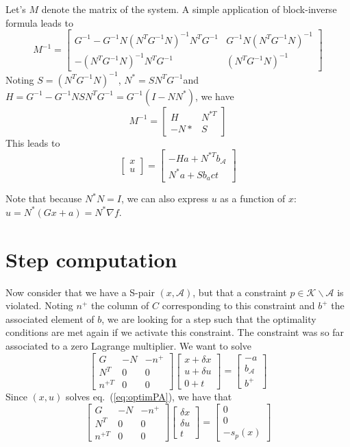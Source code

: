 \documentclass[11pt,a4paper]{article}
\newcommand{\BIN}{\begin{bmatrix}}
\newcommand{\BOUT}{\end{bmatrix}}
\newcommand{\eq}[1]{eq.~(\ref{eq:#1})}
\newcommand{\act}{\mathcal{A}}
\begin{document}
Let's $M$ denote the matrix of the system. A simple application of block-inverse formula leads to
\begin{equation}
M^{-1} = \BIN G^{-1} - G^{-1} N (N^T G^{-1} N)^{-1} N^T G^{-1} & G^{-1} N (N^T G^{-1} N)^{-1} \\ - (N^T G^{-1} N)^{-1} N^T G^{-1} & (N^T G^{-1} N)^{-1} \BOUT
\end{equation}
Noting $S = (N^T G^{-1} N)^{-1}$, $N^* = S N^T G^{-1}$\newline and $H = G^{-1} - G^{-1} N S N^T G^{-1} = G^{-1}(I-N N^*)$, we have
\begin{equation}
M^{-1} = \BIN H & N^{*T} \\ - N* & S \BOUT
\end{equation}
This leads to 
\begin{equation}
	\BIN x \\ u \BOUT = \BIN -H a + N^{*T} b_\act \\ N^* a + S b_act\BOUT
\end{equation}

Note that because $N^* N = I$, we can also express $u$ as a function of $x$: $u = N^* (Gx+a) = N^* \nabla f$.


\section{Step computation}
Now consider that we have a S-pair $(x,\act)$, but that a constraint $p \in \mathcal{K} \backslash \act$ is violated. Noting $n^+$ the column of $C$ corresponding to this constraint and $b^+$ the associated element of $b$, we are looking for a step such that the optimality conditions are met again if we activate this constraint. The constraint was so far associated to a zero Lagrange multiplier. We want to solve
\begin{equation}
	\BIN G & -N & -n^+ \\ N^T & 0 & 0 \\ n^{+T} & 0 & 0\BOUT \BIN x + \delta x \\ u + \delta u \\ 0 + t\BOUT = \BIN -a \\ b_\act \\ b^+\BOUT
\end{equation}
Since $(x,u)$ solves \eq{optimPA}, we have that
\begin{equation}
	\BIN G & -N & -n^+ \\ N^T & 0 & 0 \\ n^{+T} & 0 & 0\BOUT \BIN \delta x \\ \delta u \\ t\BOUT = \BIN 0 \\ 0 \\ - s_p(x)\BOUT
\end{equation}
\end{document}
